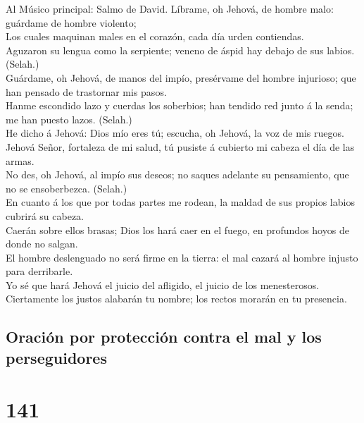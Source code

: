  Al Músico principal: Salmo de David. Líbrame, oh Jehová,
de hombre malo: guárdame de hombre violento;\\
 Los cuales maquinan males en el corazón, cada día urden
contiendas.\\
 Aguzaron su lengua como la serpiente; veneno de áspid hay
debajo de sus labios. (Selah.)\\
 Guárdame, oh Jehová, de manos del impío, presérvame del
hombre injurioso; que han pensado de trastornar mis pasos.\\
 Hanme escondido lazo y cuerdas los soberbios; han tendido
red junto á la senda; me han puesto lazos. (Selah.)\\
 He dicho á Jehová: Dios mío eres tú; escucha, oh Jehová,
la voz de mis ruegos.\\
 Jehová Señor, fortaleza de mi salud, tú pusiste á
cubierto mi cabeza el día de las armas.\\
 No des, oh Jehová, al impío sus deseos; no saques
adelante su pensamiento, que no se ensoberbezca. (Selah.)\\
 En cuanto á los que por todas partes me rodean, la maldad
de sus propios labios cubrirá su cabeza.\\
 Caerán sobre ellos brasas; Dios los hará caer en el
fuego, en profundos hoyos de donde no salgan.\\
 El hombre deslenguado no será firme en la tierra: el mal
cazará al hombre injusto para derribarle.\\
 Yo sé que hará Jehová el juicio del afligido, el juicio
de los menesterosos.\\
 Ciertamente los justos alabarán tu nombre; los rectos
morarán en tu presencia.

\hypertarget{oraciuxf3n-por-protecciuxf3n-contra-el-mal-y-los-perseguidores}{%
\subsection{Oración por protección contra el mal y los
perseguidores}\label{oraciuxf3n-por-protecciuxf3n-contra-el-mal-y-los-perseguidores}}

\hypertarget{section-140}{%
\section{141}\label{section-140}}

